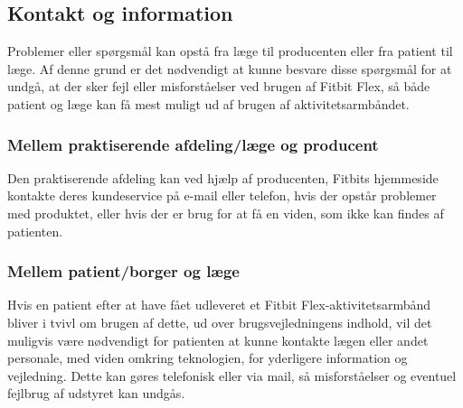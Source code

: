\subsection{Kontakt og information}

Problemer eller spørgsmål kan opstå fra læge til producenten eller fra patient til læge. Af denne grund er det nødvendigt at kunne besvare disse spørgsmål for at undgå, at der sker fejl eller misforståelser ved brugen af Fitbit Flex, så både patient og læge kan få mest muligt ud af brugen af aktivitetsarmbåndet. 

\subsubsection{Mellem praktiserende afdeling/læge og producent}

Den praktiserende afdeling kan ved hjælp af producenten, Fitbits hjemmeside kontakte deres kundeservice på e-mail eller telefon, hvis der opstår problemer med produktet, eller hvis der er brug for at få en viden, som ikke kan findes af patienten. 

\subsubsection{Mellem patient/borger og læge}

Hvis en patient efter at have fået udleveret et Fitbit Flex-aktivitetsarmbånd bliver i tvivl om brugen af dette, ud over brugsvejledningens indhold, vil det muligvis være nødvendigt for patienten at kunne kontakte lægen eller andet personale, med viden omkring teknologien, for yderligere information og vejledning. Dette kan gøres telefonisk eller via mail, så misforståelser og eventuel fejlbrug af udstyret kan undgås. 
